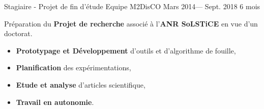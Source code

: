 \jobposition%
{Stagiaire - Projet de fin d'étude}%
{Equipe M2DisCO}
{Mars 2014--- Sept. 2018}%
{6 mois}%
{
	Préparation du \textbf{Projet de recherche} associé à l'\textbf{ANR SoLSTiCE}
	en vue d'un doctorat.
	\vspace{0.5em}
	\begin{itemize}
		\item \textbf{Prototypage et Développement} d’outils et d’algorithme de fouille,
		\item \textbf{Planification} des expérimentations,
		\item \textbf{Etude et analyse} d'articles scientifique,
		\item \textbf{Travail en autonomie}.
	\end{itemize}
	\vspace{0.5em}
}
